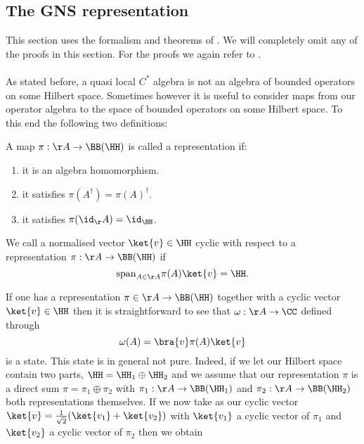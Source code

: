 \subsection{The GNS representation}\label{sec:the-gns-representation}
This section uses the formalism and theorems of \cite{bratteli1979operator}. We will completely omit any of the proofs in this section. For the proofs we again refer to \cite{bratteli1979operator}.\\\\
As stated before, a quasi local $C^*$ algebra is not an algebra of bounded operators on some Hilbert space. Sometimes however it is useful to consider maps from our operator algebra to the space of bounded operators on some Hilbert space. To this end the following two definitions:
\begin{definition}[representation]
	A map $\pi:\AA\rightarrow \BB(\HH)$ is called a representation if:
	\begin{enumerate}
		\item it is an algebra homomorphism.
		\item it satisfies $\pi(A^\dagger)=\pi(A)^\dagger$.
		\item it satisfies $\pi(\id_\AA)=\id_{\HH}$.
	\end{enumerate}
\end{definition}
\begin{definition}
	We call a normalised vector $\ket{v}\in\HH$ cyclic with respect to a representation $\pi:\AA\rightarrow \BB(\HH)$ if
	\begin{equation}
		\textrm{span}_{A\in\AA}\pi(A)\ket{v}=\HH.
	\end{equation}
\end{definition}
If one has a representation $\pi\in\AA\rightarrow\BB(\HH)$ together with a cyclic vector $\ket{v}\in\HH$ then it is straightforward to see that $\omega:\AA\rightarrow\CC$ defined through
\begin{equation}\label{eq:StateBelongingToRepresentation}
	\omega(A)=\bra{v}\pi(A)\ket{v}
\end{equation}
is a state. This state is in general not pure. Indeed, if we let our Hilbert space contain two parts, $\HH=\HH_1\oplus\HH_2$ and we assume that our representation $\pi$ is a direct sum $\pi=\pi_1\oplus\pi_2$ with $\pi_1:\AA\rightarrow\BB(\HH_1)$ and $\pi_2:\AA\rightarrow\BB(\HH_2)$ both representations themselves. If we now take as our cyclic vector $\ket{v}=\frac{1}{\sqrt{2}}(\ket{v_1}+\ket{v_2})$ with $\ket{v_1}$ a cyclic vector of $\pi_1$ and $\ket{v_2}$ a cyclic vector of $\pi_2$ then we obtain
